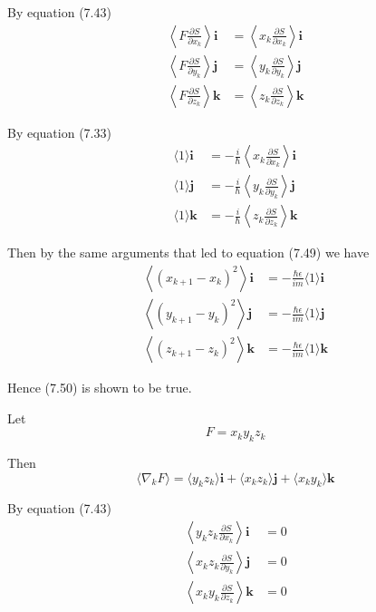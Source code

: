 \documentclass[12pt]{article}
\begin{document}
By equation (7.43)
\begin{align*}
\left\langle F\frac{\partial S}{\partial x_k}\right\rangle\mathbf i
&=\left\langle x_k\frac{\partial S}{\partial x_k}\right\rangle\mathbf i
\\
\left\langle F\frac{\partial S}{\partial y_k}\right\rangle\mathbf j
&=\left\langle y_k\frac{\partial S}{\partial y_k}\right\rangle\mathbf j
\\
\left\langle F\frac{\partial S}{\partial z_k}\right\rangle\mathbf k
&=\left\langle z_k\frac{\partial S}{\partial z_k}\right\rangle\mathbf k
\end{align*}

By equation (7.33)
\begin{align*}
\langle1\rangle\mathbf i
&=-\frac{i}{\hbar}\left\langle x_k\frac{\partial S}{\partial x_k}\right\rangle\mathbf i
\\
\langle1\rangle\mathbf j
&=-\frac{i}{\hbar}\left\langle y_k\frac{\partial S}{\partial y_k}\right\rangle\mathbf j
\\
\langle1\rangle\mathbf k
&=-\frac{i}{\hbar}\left\langle z_k\frac{\partial S}{\partial z_k}\right\rangle\mathbf k
\end{align*}

Then by the same arguments that led to equation (7.49) we have
\begin{align*}
\left\langle(x_{k+1}-x_k)^2\right\rangle\mathbf i&=-\frac{\hbar\epsilon}{im}\langle1\rangle\mathbf i
\\
\left\langle(y_{k+1}-y_k)^2\right\rangle\mathbf j&=-\frac{\hbar\epsilon}{im}\langle1\rangle\mathbf j
\\
\left\langle(z_{k+1}-z_k)^2\right\rangle\mathbf k&=-\frac{\hbar\epsilon}{im}\langle1\rangle\mathbf k
\end{align*}

Hence (7.50) is shown to be true.

\bigskip
Let
\begin{equation*}
F=x_ky_kz_k
\end{equation*}

Then
\begin{equation*}
\langle\nabla_kF\rangle
=\langle y_kz_k\rangle\mathbf i
+\langle x_kz_k\rangle\mathbf j
+\langle x_ky_k\rangle\mathbf k
\end{equation*}

By equation (7.43)
\begin{align*}
\left\langle y_kz_k\frac{\partial S}{\partial x_k}\right\rangle\mathbf i&=0
\\
\left\langle x_kz_k\frac{\partial S}{\partial y_k}\right\rangle\mathbf j&=0
\\
\left\langle x_ky_k\frac{\partial S}{\partial z_k}\right\rangle\mathbf k&=0
\end{align*}
\end{document}
